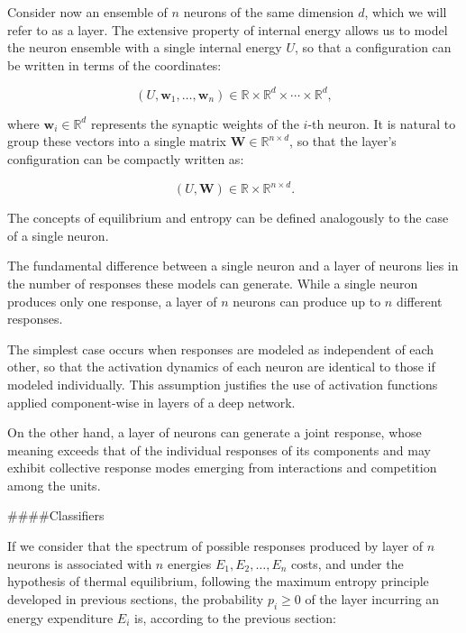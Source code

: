 \documentclass[12pt]{article}
\begin{document}
Consider now an ensemble of $n$ neurons of the same dimension $d$, which we will refer to as a layer. The extensive property of internal energy allows us to model the neuron ensemble with a single internal energy $U$, so that a configuration can be written in terms of the coordinates:

\begin{equation}
(U, \mathbf{w}_1, \ldots, \mathbf{w}_n) \in \mathbb{R} \times \mathbb{R}^{d} \times \cdots \times \mathbb{R}^d  ,
\end{equation}

where $\mathbf{w}_i \in \mathbb{R}^d$ represents the synaptic weights of the $i$-th neuron. It is natural to group these vectors into a single matrix $\mathbf{W} \in \mathbb{R}^{n \times d}$, so that the layer’s configuration can be compactly written as:

\begin{equation}
(U, \mathbf{W}) \in \mathbb{R} \times \mathbb{R}^{n \times d}.
\end{equation}

The concepts of equilibrium and entropy can be defined analogously to the case of a single neuron.

The fundamental difference between a single neuron and a layer of neurons lies in the number of responses these models can generate. While a single neuron produces only one response, a layer of $n$ neurons can produce up to $n$ different responses.

The simplest case occurs when responses are modeled as independent of each other, so that the activation dynamics of each neuron are identical to those if modeled individually. This assumption justifies the use of activation functions applied component-wise in layers of a deep network.

On the other hand, a layer of neurons can generate a joint response, whose meaning exceeds that of the individual responses of its components and may exhibit collective response modes emerging from interactions and competition among the units.

####Classifiers

If we consider that the spectrum of possible responses produced by layer of $n$ neurons is associated with $n$ energies $E_1, E_2, \ldots, E_n$ costs, and under the hypothesis of thermal equilibrium, following the maximum entropy principle developed in previous sections, the probability $p_i \ge 0$ of the layer incurring an energy expenditure $E_i$ is, according to the previous section:
\end{document}
